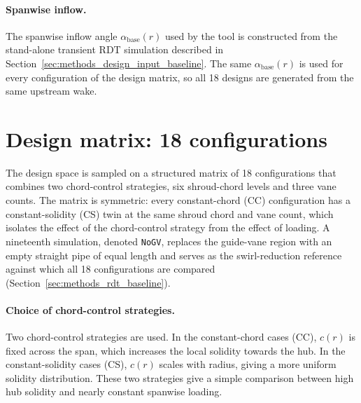 \paragraph{Spanwise inflow.}
The spanwise inflow angle $\alpha_{\mathrm{base}}(r)$ used by the tool is constructed from the stand-alone transient RDT simulation described in Section~\ref{sec:methods_design_input_baseline}. The same $\alpha_{\mathrm{base}}(r)$ is used for every configuration of the design matrix, so all 18 designs are generated from the same upstream wake.
 
\section{Design matrix: 18 configurations}
\label{sec:methods_design_matrix}
 
The design space is sampled on a structured matrix of 18 configurations that combines two chord-control strategies, six shroud-chord levels and three vane counts. The matrix is symmetric: every constant-chord (CC) configuration has a constant-solidity (CS) twin at the same shroud chord and vane count, which isolates the effect of the chord-control strategy from the effect of loading. A nineteenth simulation, denoted \texttt{NoGV}, replaces the guide-vane region with an empty straight pipe of equal length and serves as the swirl-reduction reference against which all 18 configurations are compared (Section~\ref{sec:methods_rdt_baseline}).
 
\paragraph{Choice of chord-control strategies.}
Two chord-control strategies are used. In the constant-chord cases (CC), $c(r)$ is fixed across the span, which increases the local solidity towards the hub. In the constant-solidity cases (CS), $c(r)$ scales with radius, giving a more uniform solidity distribution. These two strategies give a simple comparison between high hub solidity and nearly constant spanwise loading.
 
